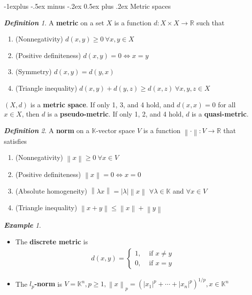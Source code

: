 \documentclass[frenchspacing,9pt,landscape,a4paper]{article}
\makeatletter
\renewcommand{\subsection}{\@startsection{subsection}{2}{0mm}%
                                {-1explus -.5ex minus -.2ex}%
                                {0.5ex plus .2ex}%
                                {\normalfont\normalsize\bfseries}}
\newcommand{\BR}{\mathbb R}
\newcommand{\abs}[1]{\left\lvert #1 \right\rvert}
\newcommand{\norm}[1]{\left\lVert #1 \right\rVert}
\theoremstyle{remark}
\newtheorem*{defn}{\textbf{Definition}}
\newtheorem*{eg}{\textbf{Example}}
\makeatother
\begin{document}
\begin{multicols}{4}
\subsection{Metric spaces}
\begin{defn}
    A \textbf{metric} on a set $X$ is a function  $d:X\times X\to\BR$ such that
     \begin{enumerate}
         \item (Nonnegativity) $d(x,y)\geq 0\ \forall x,y\in X$
         \item (Positive definiteness)  $d(x,y)=0\iff x=y$
         \item (Symmetry)  $d(x,y)=d(y,x)$
         \item (Triangle inequality)  $d(x,y)+d(y,z)\geq d(x,z)\ \forall x,y,z\in X$
     \end{enumerate} $(X,d)$ is a \textbf{metric space}. If only 1, 3, and 4 hold, and $d(x,x)=0$ for all
      $x\in X$, then $d$ is a
     \textbf{pseudo-metric}. If only 1, 2, and 4 hold,  $d$ is a \textbf{quasi-metric}.
\end{defn}
\begin{defn}
    A \textbf{norm} on a $\mathbb{K}$-vector space  $V$ is a function  $\norm{\cdot}:V\to\BR$ that
    satisfies
     \begin{enumerate}
         \item (Nonnegativity) $\norm{x}\geq 0\ \forall x\in V$ 
         \item (Positive definiteness) $\norm{x}=0\iff x=0$
         \item  (Absolute homogeneity) $\norm{\lambda x}=\abs{\lambda}\norm{x}$
             $\forall\lambda\in\mathbb{K}$ and $\forall x\in V$ 
         \item (Triangle inequality)  $\norm{x+y}\leq\norm{x}+\norm{y}$
    \end{enumerate}
\end{defn}
\begin{eg}
\begin{itemize}
    \item The \textbf{discrete metric} is
        \begin{align*}
            d(x,y)=
            \begin{cases}
                1, & \text{ if }x\neq y\\
                0, & \text{ if } x=y
            \end{cases}
        \end{align*}
    \item The \textbf{$l_p$-norm} is $V=\mathbb{K}^n,p\geq 1,\norm{x}_p=(\abs{x_1}^p+\cdots+\abs{x_n}^p)^{1 /p},x\in\mathbb{K}^n$ 

\end{itemize}
\end{eg}
\end{multicols}
\end{document}
